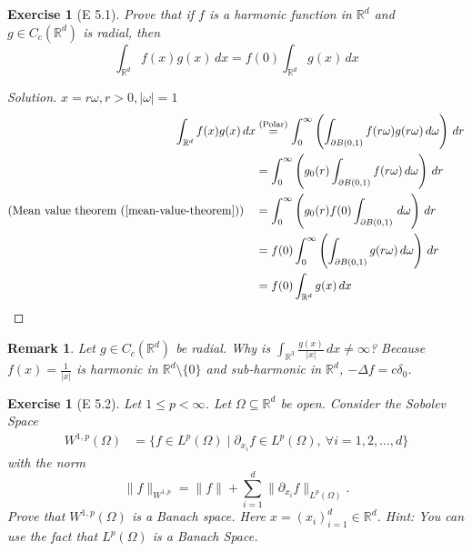 \documentclass{report}
\theoremstyle{tommy}
\newtheorem{rem}[defn]{Remark}
\newtheorem{ex}[defn]{Exercise}
\begin{document}
  \begin{ex}[E 5.1]
    Prove that if \(f\) is a harmonic function in \(\mathbb{R}^d\) and \(g \in C_c(\mathbb{R}^d)\) is radial, then
    \[\int_{\mathbb{R}^d} f(x) g(x) \, dx = f(0) \int_{\mathbb{R}^d} g(x) \, dx\]
  \end{ex}

  \begin{proof}[Solution]
    \(x = r \omega, r > 0, |\omega| = 1\)
    \begin{align*}
      \int_{\mathbb{R}^d} f(x) g(x) \, dx &\overset{{\text{(Polar)}}}{=} \int_0^\infty \left(\int_{\partial B(0,1)} f(r\omega) g(r\omega) \, d \omega\right) \, dr \\
      &= \int_0^\infty \left(g_0(r) \int_{\partial B(0, 1)} f(r \omega) \, d \omega   \right) \, dr \\
      \text{(Mean value theorem (\ref{mean-value-theorem}))} \quad &= \int_0^\infty \left(g_0(r) f(0) \int_{\partial B(0, 1)}\, d \omega\right) \, dr \\
      &= f(0) \int_0^\infty \left( \int_{\partial B(0,1)} g(r \omega) \, d \omega \right) \, dr \\
      &= f(0) \int_{\mathbb{R}^d} g(x) \, dx \qedhere
    \end{align*}
  \end{proof}

  \begin{rem}
    Let \(g \in C_c(\mathbb{R}^d)\) be radial. Why is \(\int_{\mathbb{R}^3} \frac{g(x)}{|x|} \,dx \ne \infty\)? Because \(f(x) = \frac{1}{|x|}\) is harmonic in \(\mathbb{R}^d \setminus \{0\}\) and sub-harmonic in \(\mathbb{R}^d\), \(- \Delta f= c \delta_0\).
  \end{rem}

  \begin{ex}[E 5.2]
    Let \(1 \le p < \infty\). Let \(\Omega \subseteq \mathbb{R}^d\) be open. Consider the Sobolev Space
    \begin{align*}
      W^{1, p}(\Omega) &= \{f \in L^p(\Omega) \mid \partial_{x_i} f \in L^p(\Omega), \ \forall i = 1, 2, \dots, d\}
    \end{align*}
    with the norm
    \[\| f \|_{W^{1,p}} = \|f\| + \sum_{i=1}^d \| \partial_{x_i} f\|_{L^p(\Omega)}.\]
    Prove that \(W^{1,p}(\Omega)\) is a Banach space. Here \(x = (x_i)_{i=1}^d \in \mathbb{R}^d\). Hint: You can use the fact that \(L^p(\Omega)\) is a Banach Space.
  \end{ex}
\end{document}
